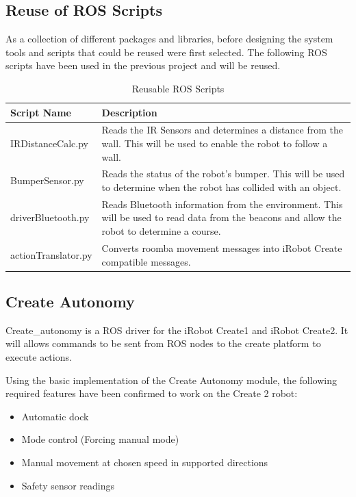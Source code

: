 \documentclass[12pt]{report}
\begin{document}
\subsection{Reuse of ROS Scripts}
\label{ROSReuse}
As a collection of different packages and libraries, before designing the system tools and scripts that could be reused were first selected. The following ROS scripts have been used in the previous project and will be reused.
\begin{table}[H]
\centering
\caption{Reusable ROS Scripts}
\centering
\begin{tabular} { | p{4cm} | p{8cm} | }
\hline
Script Name & Description \\
\hline
IRDistanceCalc.py & Reads the IR Sensors and determines a distance from the wall. This will be used to enable the robot to follow a wall. \\
\hline
BumperSensor.py & Reads the status of the robot's bumper. This will be used to determine when the robot has collided with an object. \\
\hline
driverBluetooth.py & Reads Bluetooth information from the environment. This will be used to read data from the beacons and allow the robot to determine a course. \\
\hline
actionTranslator.py & Converts roomba movement messages into iRobot Create compatible messages. \\
\hline
\end{tabular}
\end{table}%

\subsection{Create Autonomy}
Create\_autonomy is a ROS driver for the iRobot Create1 and iRobot Create2. It will allows commands to be sent from ROS nodes to the create platform to execute actions. 

Using the basic implementation of the Create Autonomy module, the following required features have been confirmed to work on the Create 2 robot:
\begin{itemize}
  \item Automatic dock
  \item Mode control (Forcing manual mode)
  \item Manual movement at chosen speed in supported directions
  \item Safety sensor readings
\end{itemize}
\end{document}
